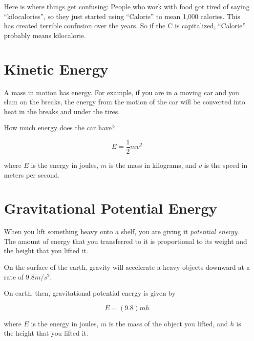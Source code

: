 Here is where things get confusing: People who work with food got tired of
saying ``kilocalories'', so they just started using ``Calorie'' to
mean 1,000 calories.  This has created terrible confusion over the
years. So if the C is capitalized, ``Calorie'' probably means kilocalorie.

\section{Kinetic Energy}

A mass in motion has energy. For example, if you are in a moving car
and you slam on the breaks, the energy from the motion of the
car will be converted into heat in the breaks and under the tires.

How much energy does the car have?

\begin{mdframed}[style=important, frametitle={Formula for Kinetic Energy}]

$$E = \frac{1}{2} m v^2$$

where $E$ is the energy in joules, $m$ is the mass in kilograms, and
$v$ is the speed in meters per second.

\end{mdframed}

\section{Gravitational Potential Energy}

When you lift something heavy onto a shelf, you are giving it
\textit{potential energy}. The amount of energy that you transferred
to it is proportional to its weight and the height that you lifted it.

On the surface of the earth, gravity will accelerate a heavy objects downward at
a rate of $9.8 m/s^2$.

\begin{mdframed}[style=important, frametitle={Formula for Gravitational Potential Energy}]
On earth, then, gravitational potential energy is given by

$$E = (9.8)mh$$


where $E$ is the energy in joules, $m$ is the mass of the object you
lifted, and $h$ is the height that you lifted it.

\end{mdframed}


